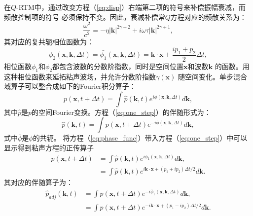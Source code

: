 在$Q$-RTM中，通过改变方程（\ref{eq:disp}）右端第二项的符号来补偿振幅衰减，而频散控制项的符号
必须保持不变。因此，衰减补偿常$Q$方程对应的频散关系为：
\begin{equation}
    \frac{\omega^2}{c^2}=-\eta|\mathbf{k}|^{2\gamma+2}+i\omega\tau|\mathbf{k}|^{2\gamma+1},
	\label{eq:disp1}
\end{equation}
其对应的复共轭相位函数为：
\begin{equation}
	\phi_2(\mathbf{x},\mathbf{k},\Delta t)=\bar{\phi_1}(\mathbf{x},\mathbf{k},\Delta t)
    =\mathbf{k}\cdot\mathbf{x}+\frac{ip_1+p_2}{2}\Delta t,
	\label{eq:phase_func1}
\end{equation}
相位函数$\phi_1$和$\phi_2$都包含波数的分数阶指数，同时是空间位置$\mathbf{x}$和波数$\mathbf{k}$
的函数。用这种相位函数来延拓粘声波场，并允许分数阶指数$\gamma(\mathbf{x})$
随空间变化。单步混合域算子可以整合成如下的Fourier积分算子：
\begin{equation}
	p(\mathbf{x},t+\Delta t)=\int \hat{p}(\mathbf{k},t)e^{i\phi(\mathbf{x},\mathbf{k},\Delta t)}
	d\mathbf{k},
	\label{eq:one_step}
\end{equation}
其中$\hat{p}$是$p$的空间Fourier变换。方程（\ref{eq:one_step}）的伴随形式为：
\begin{equation}
	\hat{p}(\mathbf{k},t)=\int p(\mathbf{x},t+\Delta t)e^{-i\bar{\phi}(\mathbf{x},\mathbf{k},
	\Delta t)}d\mathbf{k},
\end{equation}
式中$\bar{\phi}$是$\phi$的共轭。
将方程（\ref{eq:phase_func}）带入方程（\ref{eq:one_step}）中可以显示得到粘声方程的正传算子
\begin{equation}
	\begin{aligned}
		p(\mathbf{x},t+\Delta t)&=\int \hat{p}(\mathbf{k},t)e^{i\phi_1(\mathbf{x},
		\mathbf{k},\Delta t)}d\mathbf{k}, \\
		&=\int \hat{p}(\mathbf{k},t)e^{i\mathbf{k}\cdot\mathbf{x}+(p_1+ip_2)\Delta t/2}d\mathbf{k}.
	\end{aligned}
	\label{eq:forward}
\end{equation}
其对应的伴随算子为：
\begin{equation}
	\begin{aligned}
		\hat{p}_{adj}(\mathbf{k},t)&=\int p(\mathbf{x},t+\Delta t)e^{-i\bar{\phi}_1(\mathbf{x},
		\mathbf{k},\Delta t)}d\mathbf{k}, \\
		&=\int \hat{p}(\mathbf{x},t+\Delta t)e^{-i\mathbf{k}\cdot\mathbf{x}+(p_1-ip_2)\Delta t/2}d\mathbf{k}.
	\end{aligned}
	\label{eq:adjoint}
\end{equation}
